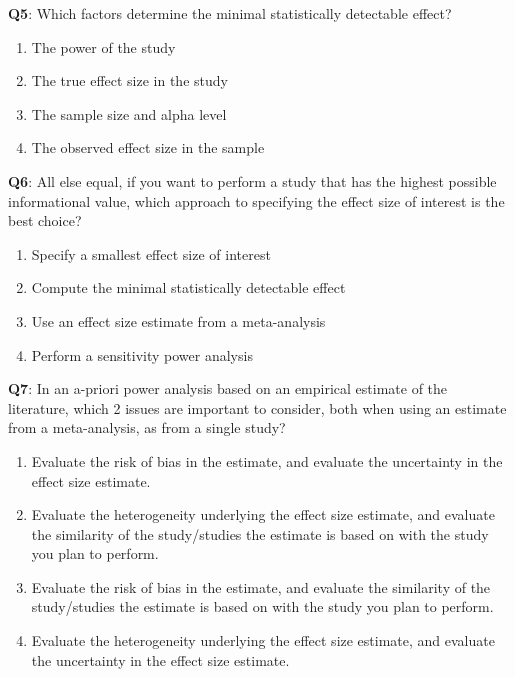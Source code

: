 \documentclass[
  oneside]{krantz}
\providecommand{\tightlist}{%
  \setlength{\itemsep}{0pt}\setlength{\parskip}{0pt}}
\begin{document}
\textbf{Q5}: Which factors determine the minimal statistically detectable effect?

\begin{enumerate}
\def\labelenumi{\Alph{enumi})}
\tightlist
\item
  The power of the study
\item
  The true effect size in the study
\item
  The sample size and alpha level
\item
  The observed effect size in the sample
\end{enumerate}

\textbf{Q6}: All else equal, if you want to perform a study that has the highest possible informational value, which approach to specifying the effect size of interest is the best choice?

\begin{enumerate}
\def\labelenumi{\Alph{enumi})}
\tightlist
\item
  Specify a smallest effect size of interest
\item
  Compute the minimal statistically detectable effect
\item
  Use an effect size estimate from a meta-analysis
\item
  Perform a sensitivity power analysis
\end{enumerate}

\textbf{Q7}: In an a-priori power analysis based on an empirical estimate of the literature, which 2 issues are important to consider, both when using an estimate from a meta-analysis, as from a single study?

\begin{enumerate}
\def\labelenumi{\Alph{enumi})}
\tightlist
\item
  Evaluate the risk of bias in the estimate, and evaluate the uncertainty in the effect size estimate.
\item
  Evaluate the heterogeneity underlying the effect size estimate, and evaluate the similarity of the study/studies the estimate is based on with the study you plan to perform.
\item
  Evaluate the risk of bias in the estimate, and evaluate the similarity of the study/studies the estimate is based on with the study you plan to perform.
\item
  Evaluate the heterogeneity underlying the effect size estimate, and evaluate the uncertainty in the effect size estimate.
\end{enumerate}
\end{document}
